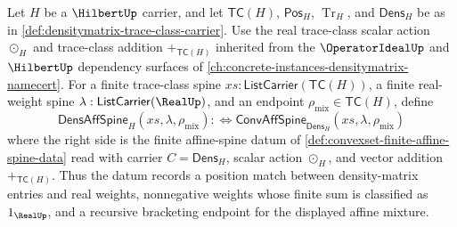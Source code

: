 \begin{definition}
\label{def:densitymatrix-affine-mixture-spine}
Let $H$ be a $\HilbertUp$ carrier, and let $\mathsf{TC}(H)$, $\mathsf{Pos}_H$, $\operatorname{Tr}_H$, and $\mathsf{Dens}_H$ be as in \autoref{def:densitymatrix-trace-class-carrier}. Use the real trace-class scalar action $\odot_H$ and trace-class addition $+_{\mathsf{TC}(H)}$ inherited from the $\OperatorIdealUp$ and $\HilbertUp$ dependency surfaces of \autoref{ch:concrete-instances-densitymatrix-namecert}. For a finite trace-class spine $xs:\mathsf{ListCarrier}(\mathsf{TC}(H))$, a finite real-weight spine $\lambda:\mathsf{ListCarrier}(\RealUp)$, and an endpoint $\rho_{\mathrm{mix}}\in\mathsf{TC}(H)$, define
$$
\mathsf{DensAffSpine}_H(xs,\lambda,\rho_{\mathrm{mix}})
:\Longleftrightarrow
\mathsf{ConvAffSpine}_{\mathsf{Dens}_H}(xs,\lambda,\rho_{\mathrm{mix}})
$$
where the right side is the finite affine-spine datum of \autoref{def:convexset-finite-affine-spine-data} read with carrier $C=\mathsf{Dens}_H$, scalar action $\odot_H$, and vector addition $+_{\mathsf{TC}(H)}$. Thus the datum records a position match between density-matrix entries and real weights, nonnegative weights whose finite sum is classified as $1_{\RealUp}$, and a recursive bracketing endpoint for the displayed affine mixture.
\end{definition}

